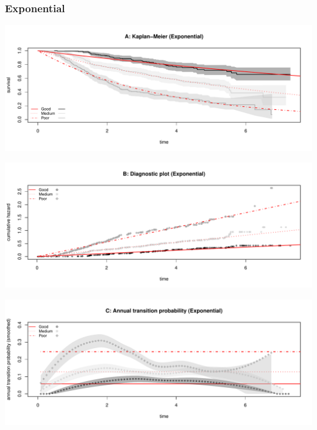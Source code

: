 \documentclass[
]{article}
\begin{document}
\clearpage

\clearpage

\subsubsection{Exponential}\label{exponential}

\begin{flushleft}\includegraphics[height=0.25\textheight]{BC_OS_output/Images/Figure_param_models-1} \end{flushleft}

\begin{flushleft}\includegraphics[height=0.25\textheight]{BC_OS_output/Images/Figure_param_models-2} \end{flushleft}

\begin{flushleft}\includegraphics[height=0.25\textheight]{BC_OS_output/Images/Figure_param_models-3} \end{flushleft}
\end{document}
